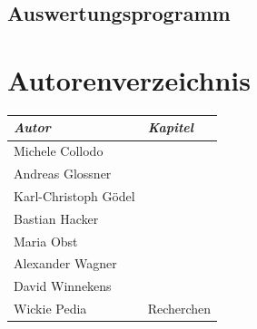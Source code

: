 \documentclass[11pt]{scrartcl}
\begin{document}
\subsection{Auswertungsprogramm}



\newpage
\section{Autorenverzeichnis}
\begin{tabular}{|l|l|}
\hline
\emph{Autor} & \emph{Kapitel}\\
\hline
Michele Collodo & \\
Andreas Glossner & \\
Karl-Christoph G\"odel & \\
Bastian Hacker & \\
Maria Obst & \\
Alexander Wagner & \\
David Winnekens &  \\
Wickie Pedia & Recherchen \\
\hline
\end{tabular}
\end{document}
